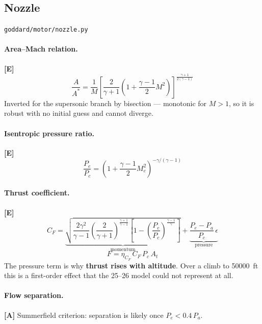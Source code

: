 \documentclass[11pt,a4paper]{article}
\newcommand{\established}{\textcolor{okgreen}{\textbf{[E]}}\xspace}
\newcommand{\approxi}{\textcolor{amber}{\textbf{[A]}}\xspace}
\newcommand{\src}[1]{\hfill{\footnotesize\texttt{#1}}}
\begin{document}
\subsection{Nozzle}
\src{goddard/motor/nozzle.py}

\paragraph{Area--Mach relation.} \established
\begin{equation}
\frac{A}{A^*} = \frac{1}{M}
\left[\frac{2}{\gamma+1}\left(1 + \frac{\gamma-1}{2}M^2\right)\right]
^{\frac{\gamma+1}{2(\gamma-1)}}
\end{equation}
Inverted for the supersonic branch by bisection --- monotonic for $M>1$, so it
is robust with no initial guess and cannot diverge.

\paragraph{Isentropic pressure ratio.} \established
\begin{equation}
\frac{P_e}{P_c} = \left(1 + \frac{\gamma-1}{2}M_e^2\right)^{-\gamma/(\gamma-1)}
\end{equation}

\paragraph{Thrust coefficient.} \established
\begin{equation}
\boxed{\
C_F = \underbrace{\sqrt{\frac{2\gamma^2}{\gamma-1}
      \left(\frac{2}{\gamma+1}\right)^{\frac{\gamma+1}{\gamma-1}}
      \left[1 - \left(\frac{P_e}{P_c}\right)^{\frac{\gamma-1}{\gamma}}\right]}}
      _{\text{momentum}}
    + \underbrace{\frac{P_e - P_a}{P_c}\,\epsilon}_{\text{pressure}}
\ }
\end{equation}
\begin{equation}
F = \eta_{C_F}\, C_F\, P_c\, A_t
\end{equation}
The pressure term is why \textbf{thrust rises with altitude}. Over a climb to
\SI{50000}{ft} this is a first-order effect that the 25--26 model could not
represent at all.

\paragraph{Flow separation.} \approxi
Summerfield criterion: separation is likely once $P_e < 0.4\,P_a$.
\end{document}
